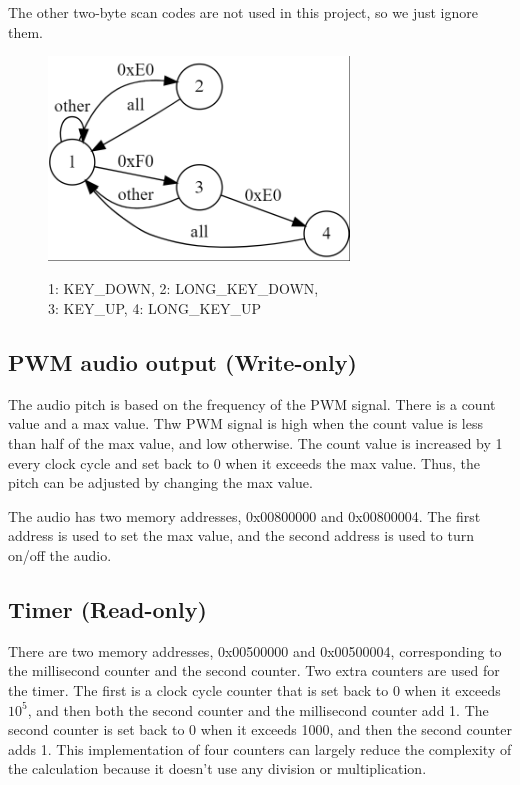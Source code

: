 \documentclass[
	a4paper, %
	11pt, %
]{CSUniSchoolLabReport}
\begin{document}
The other two-byte scan codes are not used in this project, so we just ignore them.

\begin{figure}[!htb]
    \centering
    \includegraphics[width=8cm]{image1.png}
    \par 1: KEY\_DOWN, 2: LONG\_KEY\_DOWN, \\ 3: KEY\_UP, 4: LONG\_KEY\_UP
    \label{fig:image1}

\end{figure}


\subsection{PWM audio output (Write-only)}
The audio pitch is based on the frequency of the PWM signal. There is a count value and a max value. Thw PWM signal is high when the count value is less than half of the max value, and low otherwise. The count value is increased by 1 every clock cycle and set back to 0 when it exceeds the max value. Thus, the pitch can be adjusted by changing the max value.

The audio has two memory addresses, 0x00800000 and 0x00800004. The first address is used to set the max value, and the second address is used to turn on/off the audio.

\subsection{Timer (Read-only)}
There are two memory addresses, 0x00500000 and 0x00500004, corresponding to the millisecond counter and the second counter. Two extra counters are used for the timer. The first is a clock cycle counter that is set back to 0 when it exceeds $10^5$, and then both the second counter and the millisecond counter add 1. The second counter is set back to 0 when it exceeds 1000, and then the second counter adds 1. This implementation of four counters can largely reduce the complexity of the calculation because it doesn't use any division or multiplication.
\end{document}
